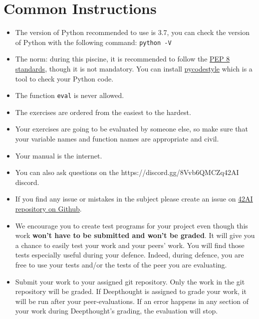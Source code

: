 
\chapter*{Common Instructions}
\begin{itemize}
  \item The version of Python recommended to use is 3.7, you can
  check the version of Python with the following command: \texttt{python -V}
  
  \item The norm: during this piscine, it is recommended to follow the
  \href{https://www.python.org/dev/peps/pep-0008/}{PEP 8 standards}, though it is not mandatory.
  You can install \href{https://pypi.org/project/pycodestyle}{pycodestyle} which
  is a tool to check your Python code.
  
  \item The function \texttt{eval} is never allowed.
  
  \item The exercises are ordered from the easiest to the hardest.
  
  \item Your exercises are going to be evaluated by someone else,
  so make sure that your variable names and function names are appropriate and civil. 
  
  \item Your manual is the internet.
  
  \item You can also ask questions on the {https://discord.gg/8Vvb6QMCZq}{42AI} discord.
  
  \item If you find any issue or mistakes in the subject please create an issue on \href{https://github.com/42-AI/bootcamp_python/issues}{42AI repository on Github}.  
  
  \item We encourage you to create test programs for your
  project even though this work \textbf{won't have to be
  submitted and won't be graded}. It will give you a chance
  to easily test your work and your peers’ work. You will find
  those tests especially useful during your defence. Indeed,
  during defence, you are free to use your tests and/or the
  tests of the peer you are evaluating.
  
  \item Submit your work to your assigned git repository. Only the work in the
  git repository will be graded. If Deepthought is assigned to grade your
  work, it will be run after your peer-evaluations.
  If an error happens in any section of your work during Deepthought's grading,
  the evaluation will stop.
\end{itemize}
